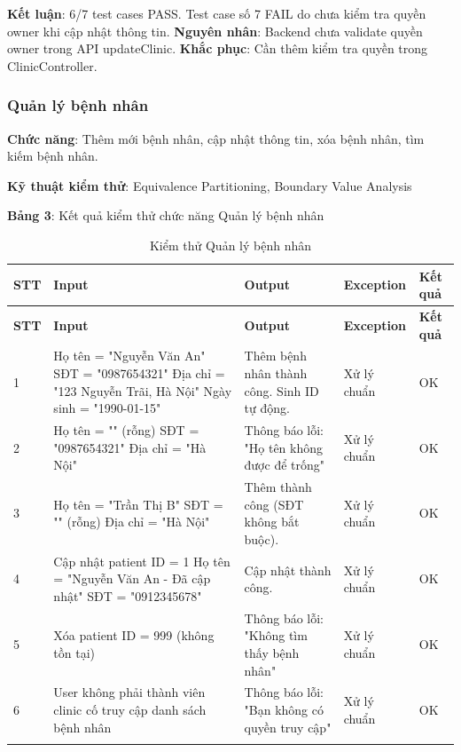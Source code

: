 \textbf{Kết luận}: 6/7 test cases PASS. Test case số 7 FAIL do chưa kiểm tra quyền owner khi cập nhật thông tin. \textbf{Nguyên nhân}: Backend chưa validate quyền owner trong API updateClinic. \textbf{Khắc phục}: Cần thêm kiểm tra quyền trong ClinicController.

\subsubsection{Quản lý bệnh nhân}

\textbf{Chức năng}: Thêm mới bệnh nhân, cập nhật thông tin, xóa bệnh nhân, tìm kiếm bệnh nhân.

\textbf{Kỹ thuật kiểm thử}: Equivalence Partitioning, Boundary Value Analysis

\textbf{Bảng 3}: Kết quả kiểm thử chức năng Quản lý bệnh nhân

\begin{longtable}{|p{1cm}|p{5cm}|p{4cm}|p{3cm}|p{1.5cm}|}
\hline
\textbf{STT} & \textbf{Input} & \textbf{Output} & \textbf{Exception} & \textbf{Kết quả} \\
\hline
\endfirsthead

\hline
\textbf{STT} & \textbf{Input} & \textbf{Output} & \textbf{Exception} & \textbf{Kết quả} \\
\hline
\endhead

\hline
\endfoot

1 & Họ tên = "Nguyễn Văn An" \newline SĐT = "0987654321" \newline Địa chỉ = "123 Nguyễn Trãi, Hà Nội" \newline Ngày sinh = "1990-01-15" & Thêm bệnh nhân thành công. Sinh ID tự động. & Xử lý chuẩn & OK \\
\hline

2 & Họ tên = "" (rỗng) \newline SĐT = "0987654321" \newline Địa chỉ = "Hà Nội" & Thông báo lỗi: "Họ tên không được để trống" & Xử lý chuẩn & OK \\
\hline

3 & Họ tên = "Trần Thị B" \newline SĐT = "" (rỗng) \newline Địa chỉ = "Hà Nội" & Thêm thành công (SĐT không bắt buộc). & Xử lý chuẩn & OK \\
\hline

4 & Cập nhật patient ID = 1 \newline Họ tên = "Nguyễn Văn An - Đã cập nhật" \newline SĐT = "0912345678" & Cập nhật thành công. & Xử lý chuẩn & OK \\
\hline

5 & Xóa patient ID = 999 (không tồn tại) & Thông báo lỗi: "Không tìm thấy bệnh nhân" & Xử lý chuẩn & OK \\
\hline

6 & User không phải thành viên clinic cố truy cập danh sách bệnh nhân & Thông báo lỗi: "Bạn không có quyền truy cập" & Xử lý chuẩn & OK \\
\hline

\caption{Kiểm thử Quản lý bệnh nhân}
\end{longtable}

